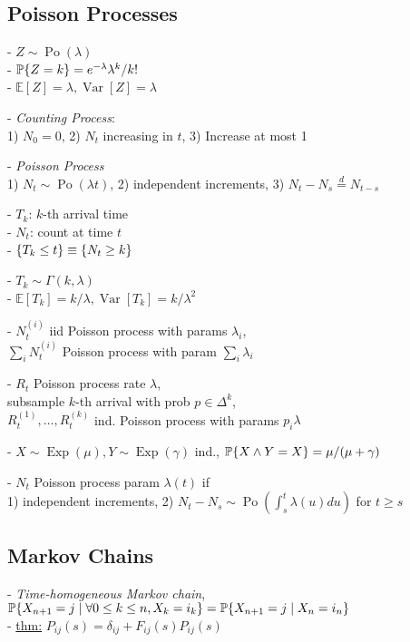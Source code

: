 \documentclass[10pt]{article}
\DeclarePairedDelimiter{\set}{\lbrace}{\rbrace}
\DeclareMathOperator{\Var}{Var}
\DeclareMathOperator{\Po}{Po}
\DeclareMathOperator{\Exp}{Exp}
\newcommand{\eq}[1]{\stackrel{#1}{=}}
\newcommand{\E}{\mathbb{E}}
\renewcommand{\P}{\mathbb{P}}
\begin{document}
\begin{multicols}{3}
\subsection*{Poisson Processes}
- $Z\sim \Po(\lambda)$ \\
- $\P\set{Z=k} = e^{-\lambda} \lambda^k / k!$ \\
- $\E[Z] = \lambda, \Var[Z] = \lambda$

- \emph{Counting Process}: \\
1) $N_0 = 0$,
2) $N_t$ increasing in $t$,
3) Increase at most 1

- \emph{Poisson Process} \\
1) $N_t\sim \Po(\lambda t)$,
2) independent increments,
3) $N_t - N_s\eq{d} N_{t-s}$

- $T_k$: $k$-th arrival time \\
- $N_t$: count at time $t$ \\
- $\set{T_k\leq t} \equiv \set{N_t\geq k}$

- $T_k\sim \Gamma(k, \lambda)$ \\
- $\E[T_k] = k/\lambda, \Var[T_k] = k/\lambda^2$

- $N_t^{(i)}$ iid Poisson process with params $\lambda_i$, \\
$\sum_i N_t^{(i)}$ Poisson process with param $\sum_i \lambda_i$

- $R_t$ Poisson process rate $\lambda$, \\
subsample $k$-th arrival with prob $p\in \Delta^k$, \\
$R_t^{(1)}, \dots, R_t^{(k)}$ ind. Poisson process with params $p_i\lambda$

- $X\sim \Exp(\mu), Y\sim \Exp(\gamma)$ ind.,
$\P\set{X\land Y = X} = \mu/(\mu+\gamma)$

- $N_t$ Poisson process param $\lambda(t)$ if \\
1) independent increments,
2) $N_t - N_s\sim \Po\left( \int_s^t \lambda(u)du \right)$ for $t\geq s$

\subsection*{Markov Chains}
- \emph{Time-homogeneous Markov chain}, \\
$\P\set{X_{n+1}=j\mid \forall 0\leq k\leq n, X_k=i_k} \\
= \P\set{X_{n+1}=j\mid X_n=i_n}$ \\
- \underline{thm:} $P_{ij}(s) = \delta_{ij} + F_{ij}(s) P_{ij}(s)$


\end{multicols}
\end{document}
